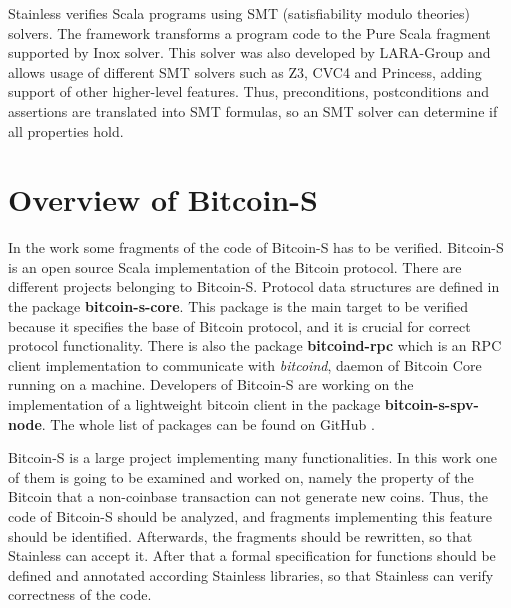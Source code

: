 Stainless verifies Scala programs using SMT (satisfiability modulo theories) solvers. 
The framework transforms a program code to the Pure Scala fragment supported by Inox solver.
This solver was also developed by LARA-Group and allows usage of different SMT solvers such as Z3, CVC4 and Princess, adding support of other higher-level features.
Thus, preconditions, postconditions and assertions are translated into SMT formulas, so an SMT solver can determine if all properties hold.\cite{Stainless:introduction}\cite{Stainless}


\section{Overview of Bitcoin-S}
\label{sec:bitcoin_s}

In the work some fragments of the code of Bitcoin-S has to be verified.
Bitcoin-S is an open source Scala implementation of the Bitcoin protocol. 
There are different projects belonging to Bitcoin-S.
Protocol data structures are defined in the package \textbf{bitcoin-s-core}.
This package is the main target to be verified because it specifies the base of Bitcoin protocol, and it is crucial for correct protocol functionality.
There is also the package \textbf{bitcoind-rpc} which is an RPC client implementation to communicate with \textit{bitcoind}, daemon of Bitcoin Core running on a machine.
Developers of Bitcoin-S are working on the implementation of a lightweight bitcoin client in the package \textbf{bitcoin-s-spv-node}.
The whole list of packages can be found on GitHub \cite{BitcoinSProject}.

Bitcoin-S is a large project implementing many functionalities.
In this work one of them is going to be examined and worked on, namely the property of the Bitcoin that a non-coinbase transaction can not generate new coins.
Thus, the code of Bitcoin-S should be analyzed, and fragments implementing this feature should be identified.
Afterwards, the fragments should be rewritten, so that Stainless can accept it.
After that a formal specification for functions should be defined and annotated according Stainless libraries, so that Stainless can verify correctness of the code.


